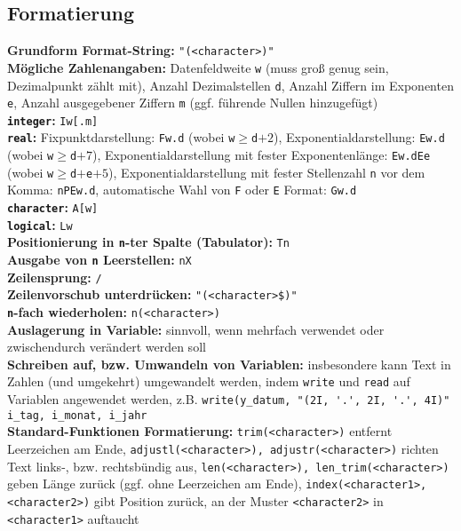 \documentclass[a4paper, twocolumn]{scrarticle}
\begin{document}
\subsection{Formatierung}\label{sec:formatierung}
\textbf{Grundform Format-String:} \lstinline|"(<character>)"|\\
\textbf{Mögliche Zahlenangaben:}  Datenfeldweite \lstinline|w| (muss groß genug sein, Dezimalpunkt zählt mit), Anzahl Dezimalstellen \lstinline|d|, Anzahl Ziffern im Exponenten \lstinline|e|, Anzahl ausgegebener Ziffern \lstinline|m| (ggf. führende Nullen hinzugefügt)\\
\textbf{\lstinline|integer|:} \lstinline|Iw[.m]|\\
\textbf{\lstinline|real|:} Fixpunktdarstellung: \lstinline|Fw.d| (wobei \lstinline|w|$\geq$\lstinline|d|$+2$), Exponentialdarstellung: \lstinline|Ew.d| (wobei \lstinline|w|$\geq$\lstinline|d|$+7$), Exponentialdarstellung mit fester Exponentenlänge: \lstinline|Ew.dEe| (wobei \lstinline|w|$\geq$\lstinline|d|$+$\lstinline|e|$+5$), Exponentialdarstellung mit fester Stellenzahl \lstinline|n| vor dem Komma: \lstinline|nPEw.d|, automatische Wahl von \lstinline|F| oder \lstinline|E| Format: \lstinline|Gw.d|\\
\textbf{\lstinline|character|:} \lstinline|A[w]|\\
\textbf{\lstinline|logical|:} \lstinline|Lw|\\
\textbf{Positionierung in \lstinline|n|-ter Spalte (Tabulator):} \lstinline|Tn|\\
\textbf{Ausgabe von \lstinline|n| Leerstellen:} \lstinline|nX|\\
\textbf{Zeilensprung:} \lstinline|/|\\
\textbf{Zeilenvorschub unterdrücken:} \lstinline|"(<character>$)"|\\
\textbf{\lstinline|n|-fach wiederholen:} \lstinline|n(<character>)|\\
\textbf{Auslagerung in Variable:} sinnvoll, wenn mehrfach verwendet oder  zwischendurch verändert werden soll\\
\textbf{Schreiben auf, bzw. Umwandeln von Variablen:} insbesondere kann Text in Zahlen (und umgekehrt) umgewandelt werden, indem \lstinline|write| und \lstinline|read| auf Variablen angewendet werden, z.B. \lstinline|write(y_datum, "(2I, '.', 2I, '.', 4I)" i_tag, i_monat, i_jahr|\\
\textbf{Standard-Funktionen Formatierung:} \lstinline|trim(<character>)| entfernt Leerzeichen am Ende, \lstinline|adjustl(<character>), adjustr(<character>)| richten Text links-, bzw. rechtsbündig aus, \lstinline|len(<character>), len_trim(<character>)| geben Länge zurück (ggf. ohne Leerzeichen am Ende), \lstinline|index(<character1>, <character2>)| gibt Position zurück, an der Muster \lstinline|<character2>| in \lstinline|<character1>| auftaucht
\end{document}
